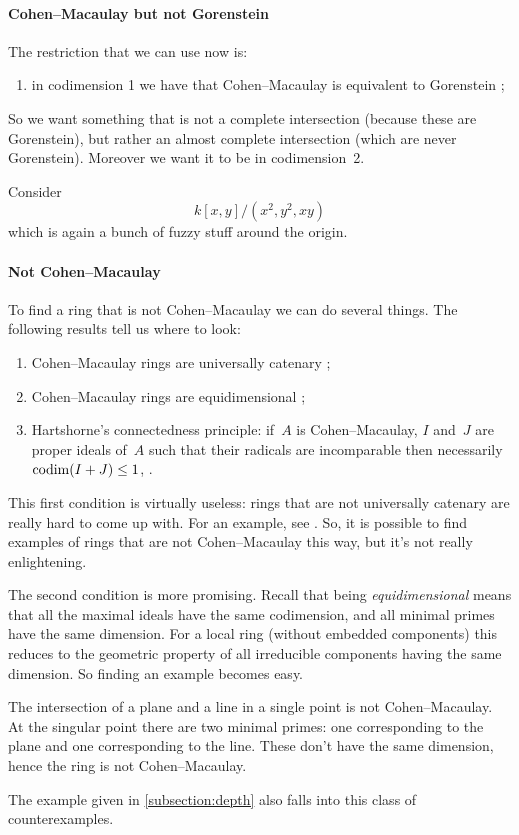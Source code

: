 \documentclass[10pt,a4paper]{article}
\begin{document}
\paragraph{Cohen--Macaulay but not Gorenstein}
The restriction that we can use now is:
\begin{enumerate}
  \item in codimension 1 we have that Cohen--Macaulay is equivalent to Gorenstein \cite[corollary 21.20]{eisenbud-commutative-algebra};
\end{enumerate}
So we want something that is not a complete intersection (because these are Gorenstein), but rather an almost complete intersection (which are never Gorenstein). Moreover we want it to be in codimension~2.
\begin{example}
  Consider
  \begin{equation}
    k[x,y]/(x^2,y^2,xy)
  \end{equation}
  which is again a bunch of fuzzy stuff around the origin.
\end{example}

\paragraph{Not Cohen--Macaulay}
To find a ring that is not Cohen--Macaulay we can do several things. The following results tell us where to look:
\begin{enumerate}
  \item Cohen--Macaulay rings are universally catenary \cite[corollary 18.10]{eisenbud-commutative-algebra};
  \item Cohen--Macaulay rings are equidimensional \cite[corollary 18.11]{eisenbud-commutative-algebra};
  \item Hartshorne's connectedness principle: if~$A$ is Cohen--Macaulay, $I$ and~$J$ are proper ideals of~$A$ such that their radicals are incomparable then necessarily~$\operatorname{codim}(I+J)\leq 1$, \cite[theorem 18.12]{eisenbud-commutative-algebra}.
\end{enumerate}
This first condition is virtually useless: rings that are not universally catenary are really hard to come up with. For an example, see \cite[tag 02JE]{stacks}. So, it is possible to find examples of rings that are not Cohen--Macaulay this way, but it's not really enlightening.

The second condition is more promising. Recall that being \emph{equidimensional} means that all the maximal ideals have the same codimension, and all minimal primes have the same dimension. For a local ring (without embedded components) this reduces to the geometric property of all irreducible components having the same dimension. So finding an example becomes easy.
\begin{example}
  The intersection of a plane and a line in a single point is not Cohen--Macaulay. At the singular point there are two minimal primes: one corresponding to the plane and one corresponding to the line. These don't have the same dimension, hence the ring is not Cohen--Macaulay.
\end{example}
The example given in \cref{subsection:depth} also falls into this class of counterexamples.
\end{document}
